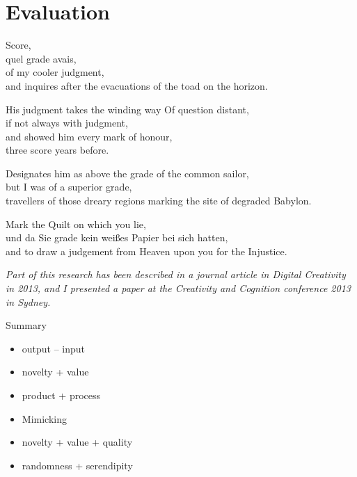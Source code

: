 
\chapter{Evaluation}
\label{ch:evaluation}

\startcontents[chapters]

Score, \\
quel grade avais, \\
of my cooler judgment, \\
and inquires after the evacuations of the toad on the horizon.

His judgment takes the winding way Of question distant, \\
if not always with judgment, \\
and showed him every mark of honour, \\
three score years before.

Designates him as above the grade of the common sailor, \\
but I was of a superior grade, \\
travellers of those dreary regions marking the site of degraded Babylon.

Mark the Quilt on which you lie, \\
und da Sie grade kein weißes Papier bei sich hatten, \\
and to draw a judgement from Heaven upon you for the Injustice.

\minicontents

\emph{Part of this research has been described in a journal article in Digital Creativity in 2013, and I presented a paper at the Creativity and Cognition conference 2013 in Sydney.}

\grule %

\begin{shaded}
  Summary
  \begin{itemize}
  \item output – input
  \item novelty + value
  \item product + process
  \item Mimicking
  \item novelty + value + quality
  \item randomness + serendipity
  \end{itemize}
\end{shaded}


